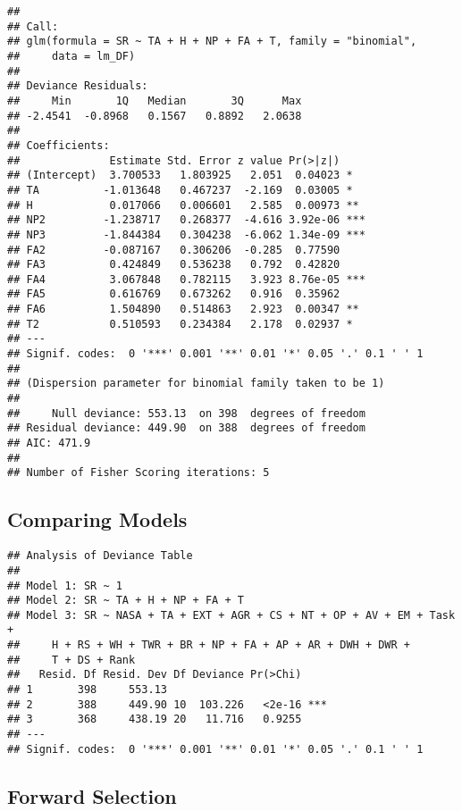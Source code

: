 \documentclass[]{article}
\begin{document}
\begin{verbatim}
## 
## Call:
## glm(formula = SR ~ TA + H + NP + FA + T, family = "binomial", 
##     data = lm_DF)
## 
## Deviance Residuals: 
##     Min       1Q   Median       3Q      Max  
## -2.4541  -0.8968   0.1567   0.8892   2.0638  
## 
## Coefficients:
##              Estimate Std. Error z value Pr(>|z|)    
## (Intercept)  3.700533   1.803925   2.051  0.04023 *  
## TA          -1.013648   0.467237  -2.169  0.03005 *  
## H            0.017066   0.006601   2.585  0.00973 ** 
## NP2         -1.238717   0.268377  -4.616 3.92e-06 ***
## NP3         -1.844384   0.304238  -6.062 1.34e-09 ***
## FA2         -0.087167   0.306206  -0.285  0.77590    
## FA3          0.424849   0.536238   0.792  0.42820    
## FA4          3.067848   0.782115   3.923 8.76e-05 ***
## FA5          0.616769   0.673262   0.916  0.35962    
## FA6          1.504890   0.514863   2.923  0.00347 ** 
## T2           0.510593   0.234384   2.178  0.02937 *  
## ---
## Signif. codes:  0 '***' 0.001 '**' 0.01 '*' 0.05 '.' 0.1 ' ' 1
## 
## (Dispersion parameter for binomial family taken to be 1)
## 
##     Null deviance: 553.13  on 398  degrees of freedom
## Residual deviance: 449.90  on 388  degrees of freedom
## AIC: 471.9
## 
## Number of Fisher Scoring iterations: 5
\end{verbatim}

\newpage

\hypertarget{comparing-models}{%
\subsection{Comparing Models}\label{comparing-models}}

\begin{verbatim}
## Analysis of Deviance Table
## 
## Model 1: SR ~ 1
## Model 2: SR ~ TA + H + NP + FA + T
## Model 3: SR ~ NASA + TA + EXT + AGR + CS + NT + OP + AV + EM + Task + 
##     H + RS + WH + TWR + BR + NP + FA + AP + AR + DWH + DWR + 
##     T + DS + Rank
##   Resid. Df Resid. Dev Df Deviance Pr(>Chi)    
## 1       398     553.13                         
## 2       388     449.90 10  103.226   <2e-16 ***
## 3       368     438.19 20   11.716   0.9255    
## ---
## Signif. codes:  0 '***' 0.001 '**' 0.01 '*' 0.05 '.' 0.1 ' ' 1
\end{verbatim}

\newpage

\hypertarget{forward-selection}{%
\subsection{Forward Selection}\label{forward-selection}}
\end{document}
